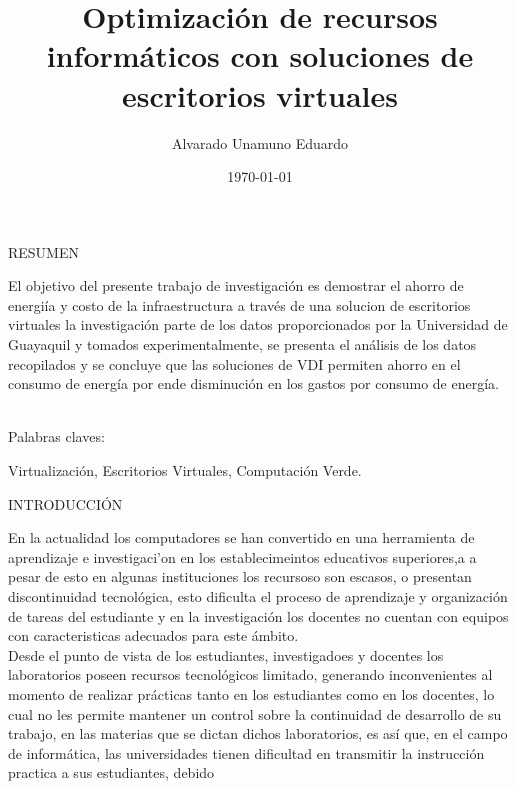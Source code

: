 \documentclass[a4paper,11pt]{article}
\begin{document}
\title{Optimizaci\'on de recursos inform\'aticos con soluciones de escritorios virtuales}
\author{Alvarado Unamuno Eduardo}
\date{\today}
\maketitle
\begin{bf}
\begin{center}
RESUMEN \\
\end{center}
\end{bf}
El objetivo del presente trabajo de investigaci\'on es demostrar 
el ahorro de energi\'ia y costo de la infraestructura a trav\'es 
de una solucion de escritorios virtuales la investigaci\'on parte de los datos proporcionados 
por la Universidad de Guayaquil y tomados experimentalmente, se presenta el an\'alisis de los 
datos recopilados y se concluye que las soluciones de VDI permiten ahorro en el consumo de energ\'ia
por ende disminuci\'on en los gastos por consumo de energ\'ia.\\   
\\
\begin{bf}
Palabras claves:
\end{bf}
Virtualizaci\'on, Escritorios Virtuales, Computación Verde. \\
\begin{bf}
\begin{center}
INTRODUCCI\'ON\\
\end{center}
\end{bf}
En la actualidad los computadores se han convertido en una herramienta de 
aprendizaje e investigaci'on en los establecimeintos educativos superiores,a a pesar de esto
en algunas instituciones los recursoso son escasos, o presentan discontinuidad
tecnol\'ogica, esto dificulta el proceso de aprendizaje y organizaci\'on de
tareas del estudiante y en la investigaci\'on los docentes no cuentan con
equipos con caracteristicas adecuados para este \'ambito.\\
Desde el punto de vista de los estudiantes, investigadoes y docentes los laboratorios
poseen recursos tecnol\'ogicos limitado, generando inconvenientes al momento
de realizar pr\'acticas tanto en los estudiantes como en los docentes,
lo cual no les permite mantener un control sobre la continuidad de desarrollo de su trabajo,
en las materias que se dictan dichos laboratorios, es as\'i que, en el campo de informática, 
las universidades tienen dificultad en transmitir la instrucci\'on practica a sus estudiantes, debido
\end{document}
